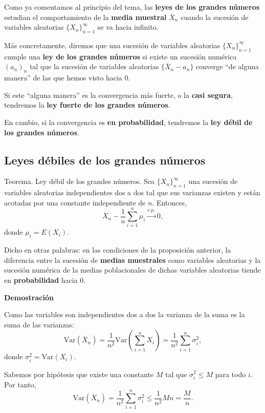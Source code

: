 \documentclass[
  letterpaper,
  DIV=11,
  numbers=noendperiod]{scrreprt}
\begin{document}
Como ya comentamos al principio del tema, las \textbf{leyes de los
grandes números} estudian el comportamiento de la \textbf{media
muestral} \(\overline{X}_n\) cuando la sucesión de variables aleatorias
\(\{X_n\}_{n=1}^\infty\) se va hacia infinito.

Más concretamente, diremos que una sucesión de variables aleatorias
\(\{X_n\}_{n=1}^\infty\) cumple una \textbf{ley de los grandes números}
si existe un sucesión numérica \((a_n)_n\) tal que la sucesión de
variables aleatorias \(\{\overline{X}_n-a_n\}\) converge ``de alguna
manera'' de las que hemos visto hacia 0.

Si este ``alguna manera'' es la convergencia más fuerte, o la
\textbf{casi segura}, tendremos la \textbf{ley fuerte de los grandes
números}.

En cambio, si la convergencia es \textbf{en probabilidad}, tendremos la
\textbf{ley débil de los grandes números}.

\hypertarget{leyes-duxe9biles-de-los-grandes-nuxfameros}{%
\subsection{Leyes débiles de los grandes
números}\label{leyes-duxe9biles-de-los-grandes-nuxfameros}}

Teorema. Ley débil de los grandes números. Sea \(\{X_n\}_{n=1}^\infty\)
una sucesión de variables aleatorias independientes dos a dos tal que
sus varianzas existen y están acotadas por una constante independiente
de \(n\). Entonces, \[
\overline{X}_n-\frac{1}{n}\sum_{i=1}^n \mu_i\stackrel{c.p.}{\longrightarrow} 0,
\] donde \(\mu_i = E(X_i)\).

Dicho en otras palabras: en las condiciones de la proposición anterior,
la diferencia entre la sucesión de \textbf{medias muestrales} como
variables aleatorias y la sucesión numérica de la medias poblacionales
de dichas variables aleatorias tiende en \textbf{probabilidad} hacia 0.

\textbf{Demostración}

Como las variables son independientes dos a dos la varianza de la suma
es la suma de las varianzas: \[
\mathrm{Var}(\overline{X}_n)=\frac{1}{n^2}\mathrm{Var}(\sum_{i=1}^n X_i)=\frac{1}{n^2}\sum_{i=1}^n \sigma_i^2,
\] donde \(\sigma_i^2 = \mathrm{Var}(X_i)\).

Sabemos por hipótesis que existe una constante \(M\) tal que
\(\sigma_i^2\leq M\) para todo \(i\). Por tanto, \[
\mathrm{Var}(\overline{X}_n)=\frac{1}{n^2}\sum_{i=1}^n \sigma_i^2\leq \frac{1}{n^2}Mn =\frac{M}{n}.
\]
\end{document}
